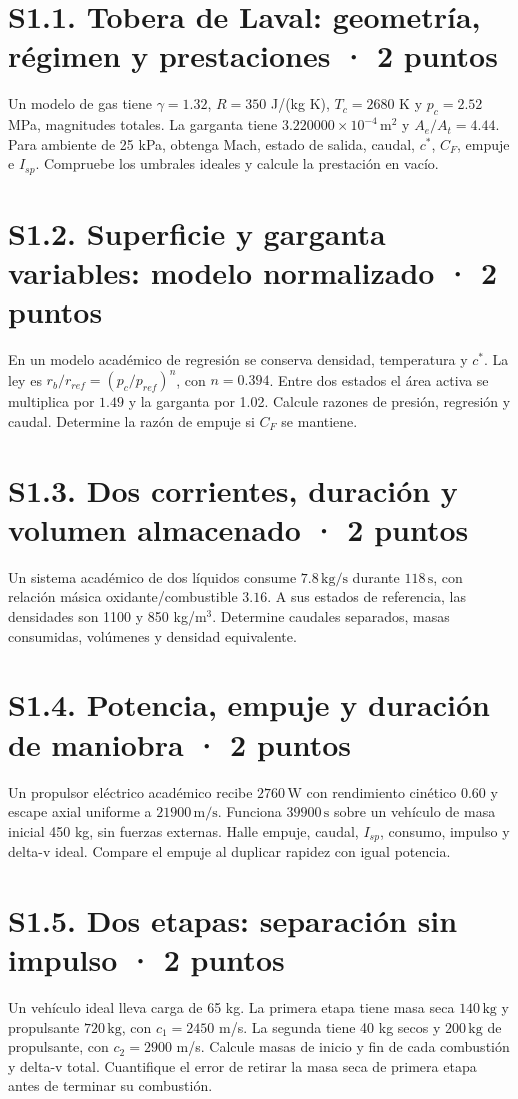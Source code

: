 \section{S1.1. Tobera de Laval: geometría, régimen y prestaciones · 2 puntos}
Un modelo de gas tiene $\gamma=1.32$, $R=350$ J/(kg K), $T_c=2680$ K y $p_c=2.52$ MPa, magnitudes totales. La garganta tiene $3.220000\times10^{-4}\,\mathrm{m^2}$ y $A_e/A_t=4.44$. Para ambiente de 25 kPa, obtenga Mach, estado de salida, caudal, $c^*$, $C_F$, empuje e $I_{sp}$. Compruebe los umbrales ideales y calcule la prestación en vacío.

\section{S1.2. Superficie y garganta variables: modelo normalizado · 2 puntos}
En un modelo académico de regresión se conserva densidad, temperatura y $c^*$. La ley es $r_b/r_{ref}=(p_c/p_{ref})^n$, con $n=0.394$. Entre dos estados el área activa se multiplica por $1.49$ y la garganta por 1.02. Calcule razones de presión, regresión y caudal. Determine la razón de empuje si $C_F$ se mantiene.

\section{S1.3. Dos corrientes, duración y volumen almacenado · 2 puntos}
Un sistema académico de dos líquidos consume $7.8\,\mathrm{kg/s}$ durante $118\,\mathrm{s}$, con relación másica oxidante/combustible $3.16$. A sus estados de referencia, las densidades son 1100 y 850 kg/m$^3$. Determine caudales separados, masas consumidas, volúmenes y densidad equivalente.

\section{S1.4. Potencia, empuje y duración de maniobra · 2 puntos}
Un propulsor eléctrico académico recibe $2760\,\mathrm{W}$ con rendimiento cinético 0.60 y escape axial uniforme a $21900\,\mathrm{m/s}$. Funciona $39900\,\mathrm{s}$ sobre un vehículo de masa inicial 450 kg, sin fuerzas externas. Halle empuje, caudal, $I_{sp}$, consumo, impulso y delta-v ideal. Compare el empuje al duplicar rapidez con igual potencia.

\section{S1.5. Dos etapas: separación sin impulso · 2 puntos}
Un vehículo ideal lleva carga de 65 kg. La primera etapa tiene masa seca $140\,\mathrm{kg}$ y propulsante $720\,\mathrm{kg}$, con $c_1=2450$ m/s. La segunda tiene 40 kg secos y $200\,\mathrm{kg}$ de propulsante, con $c_2=2900$ m/s. Calcule masas de inicio y fin de cada combustión y delta-v total. Cuantifique el error de retirar la masa seca de primera etapa antes de terminar su combustión.

